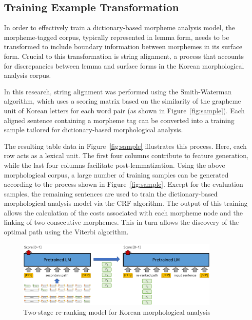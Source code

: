 \documentclass[AMS,STIX2COL]{WileyNJD-v2}
\begin{document}
    \subsection{Training Example Transformation}\label{subsec3.2}

    In order to effectively train a dictionary-based morpheme analysis model, the morpheme-tagged corpus, typically represented in lemma form, needs to be transformed to include boundary information between morphemes in its surface form. Crucial to this transformation is string alignment, a process that accounts for discrepancies between lemma and surface forms in the Korean morphological analysis corpus.

    In this research, string alignment was performed using the Smith-Waterman algorithm, which uses a scoring matrix based on the similarity of the grapheme unit of Korean letters for each word pair (as shown in Figure~\ref{fig:sample}). Each aligned sentence containing a morpheme tag can be converted into a training sample tailored for dictionary-based morphological analysis.

    The resulting table data in Figure~\ref{fig:sample} illustrates this process. Here, each row acts as a lexical unit. The first four columns contribute to feature generation, while the last four columns facilitate post-lemmatization. Using the above morphological corpus, a large number of training samples can be generated according to the process shown in Figure~\ref{fig:sample}. Except for the evaluation samples, the remaining sentences are used to train the dictionary-based morphological analysis model via the CRF algorithm. The output of this training allows the calculation of the costs associated with each morpheme node and the linking of two consecutive morphemes. This in turn allows the discovery of the optimal path using the Viterbi algorithm.

    \begin{figure}[t]
        \centerline{\includegraphics[width=0.9\textwidth]{fig3.0}}
        \caption{Two-stage re-ranking model for Korean morphological analysis}\label{fig:ranking}
    \end{figure}
\end{document}
